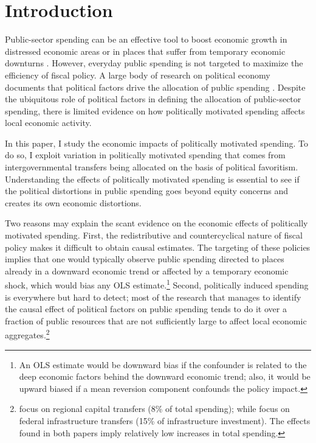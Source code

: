 \documentclass[dv_diss_main.tex]{subfiles}
\begin{document}
\section{Introduction}

\noindent Public-sector spending can be an effective tool to boost economic growth in distressed economic areas or in places that suffer from temporary economic downturns \citep{chodorow2019geographic}.
However, everyday public spending is not targeted to maximize the efficiency of fiscal policy.  A large body of research on political economy documents that political factors drive the allocation of public spending \citep{golden2013distributive}.
Despite the ubiquitous role of political factors in defining the allocation of public-sector spending, there is limited evidence on how politically motivated spending affects local economic activity.

In this paper, I study the economic impacts of politically motivated spending. To do so, I exploit variation in politically motivated spending that comes from intergovernmental transfers being allocated on the basis of political favoritism. Understanding the effects of politically motivated spending is essential to see if the political distortions in public spending goes beyond equity concerns and creates its own economic distortions.

Two reasons may explain the scant evidence on the economic effects of politically motivated spending. First, the redistributive and countercyclical nature of fiscal policy makes it difficult to obtain causal estimates. The targeting of these policies implies that one would typically observe public spending directed to places already in a downward economic trend or affected by a temporary economic shock, which would bias any OLS estimate.\footnote{An OLS estimate would be downward bias if the confounder is related to the deep economic factors behind the downward economic trend; also, it would be upward biased if a mean reversion component confounds the policy impact.}
Second, politically induced spending is everywhere but hard to detect; most of the research that manages to identify the causal effect of political factors on public spending tends to do it over a fraction of public resources that are not sufficiently large to affect local economic aggregates.\footnote{\cite{curto2018does} focus on regional capital transfers (8\% of total spending); while \cite{brollo2012tying} focus on federal infrastructure transfers (15\% of infrastructure investment). The effects found in both papers imply relatively low increases in total spending.}
\end{document}
